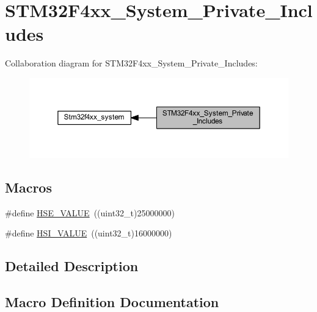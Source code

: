 \hypertarget{group___s_t_m32_f4xx___system___private___includes}{}\section{S\+T\+M32\+F4xx\+\_\+\+System\+\_\+\+Private\+\_\+\+Includes}
\label{group___s_t_m32_f4xx___system___private___includes}
Collaboration diagram for S\+T\+M32\+F4xx\+\_\+\+System\+\_\+\+Private\+\_\+\+Includes\+:\nopagebreak
\begin{figure}[H]
\begin{center}
\leavevmode
\includegraphics[width=350pt]{group___s_t_m32_f4xx___system___private___includes}
\end{center}
\end{figure}
\subsection*{Macros}
\begin{DoxyCompactItemize}
\item 
\#define \mbox{\hyperlink{group___s_t_m32_f4xx___system___private___includes_gaeafcff4f57440c60e64812dddd13e7cb}{H\+S\+E\+\_\+\+V\+A\+L\+UE}}~((uint32\+\_\+t)25000000)
\item 
\#define \mbox{\hyperlink{group___s_t_m32_f4xx___system___private___includes_gaaa8c76e274d0f6dd2cefb5d0b17fbc37}{H\+S\+I\+\_\+\+V\+A\+L\+UE}}~((uint32\+\_\+t)16000000)
\end{DoxyCompactItemize}


\subsection{Detailed Description}


\subsection{Macro Definition Documentation}
\mbox{\label{group___s_t_m32_f4xx___system___private___includes_gaeafcff4f57440c60e64812dddd13e7cb}} 
